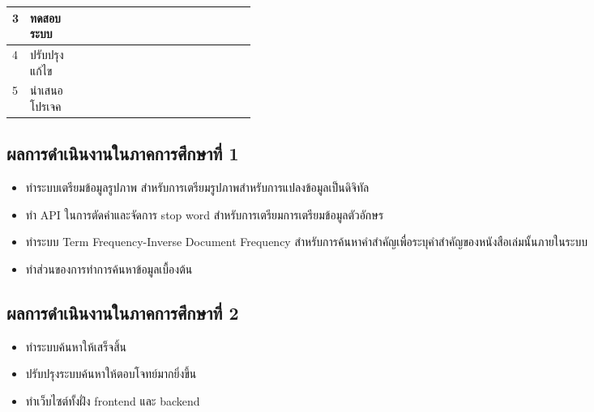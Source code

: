 \begin{table}[H]
\begin{tabular}{|l|p{0.35\linewidth}|l|l|l|l|l|l|l|l|l|l|l|l|l|l|l|l|}
3                  & ทดสอบระบบ                   &                          &                          &                          &                          & \cellcolor[HTML]{656565} & \cellcolor[HTML]{656565} & \cellcolor[HTML]{656565} & \cellcolor[HTML]{656565} & \cellcolor[HTML]{656565} & \cellcolor[HTML]{656565} & \cellcolor[HTML]{656565} & \cellcolor[HTML]{656565} & \cellcolor[HTML]{656565} & \cellcolor[HTML]{656565} &                          &                          \\ \hline
4                  & ปรับปรุงแก้ไข                   &                          &                          &                          &                          & \cellcolor[HTML]{656565} & \cellcolor[HTML]{656565} & \cellcolor[HTML]{656565} & \cellcolor[HTML]{656565} & \cellcolor[HTML]{656565} & \cellcolor[HTML]{656565} & \cellcolor[HTML]{656565} & \cellcolor[HTML]{656565} & \cellcolor[HTML]{656565} & \cellcolor[HTML]{656565} &                          &                          \\ \hline
5                  & นำเสนอโปรเจค                   &                          &                          &                          &                          &                          &                          &                          &                          &                          &                          &                          &                          &                          &                          & \cellcolor[HTML]{656565} & \cellcolor[HTML]{656565} \\ \hline
\end{tabular}
\end{table}

\subsection{ผลการดำเนินงานในภาคการศึกษาที่ 1}
\begin{itemize}
    \item ทำระบบเตรียมข้อมูลรูปภาพ สำหรับการเตรียมรูปภาพสำหรับการแปลงข้อมูลเป็นดิจิทัล
    \item ทำ API ในการตัดคำและจัดการ stop word สำหรับการเตรียมการเตรียมข้อมูลตัวอักษร
    \item ทำระบบ Term Frequency-Inverse Document Frequency สำหรับการค้นหาคำสำคัญเพื่อระบุคำสำคัญของหนังสือเล่มนั้นภายในระบบ 
    \item ทำส่วนของการทำการค้นหาข้อมูลเบื้องต้น
\end{itemize}

\subsection{ผลการดำเนินงานในภาคการศึกษาที่ 2}
\begin{itemize}
    \item ทำระบบค้นหาให้เสร็จสิ้น
    \item ปรับปรุงระบบค้นหาให้ตอบโจทย์มากยิ่งขึ้น
    \item ทำเว็บไซต์ทั้งฝั่ง frontend และ backend
\end{itemize}
